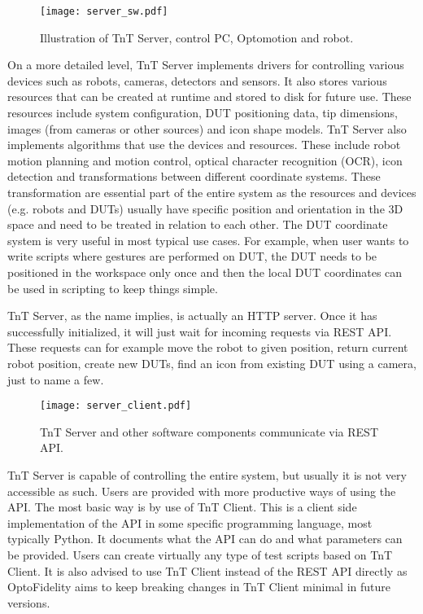 \begin{figure}[!h]
	\centering
	\texttt{[image: server\_sw.pdf]}
	\caption{Illustration of TnT Server, control PC, Optomotion and robot.}
	\label{fig:server_sw}
\end{figure}

On a more detailed level, TnT Server implements drivers for controlling various devices such as robots, cameras, detectors and sensors. It also stores various resources that can be created at runtime and stored to disk for future use. These resources include system configuration, DUT positioning data, tip dimensions, images (from cameras or other sources) and icon shape models. TnT Server also implements algorithms that use the devices and resources. These include robot motion planning and motion control, optical character recognition (OCR), icon detection and transformations between different coordinate systems. These transformation are essential part of the entire system as the resources and devices (e.g. robots and DUTs) usually have specific position and orientation in the 3D space and need to be treated in relation to each other. The DUT coordinate system is very useful in most typical use cases. For example, when user wants to write scripts where gestures are performed on DUT, the DUT needs to be positioned in the workspace only once and then the local DUT coordinates can be used in scripting to keep things simple.

TnT Server, as the name implies, is actually an HTTP server. Once it has successfully initialized, it will just wait for incoming requests via REST API. These requests can for example move the robot to given position, return current robot position, create new DUTs, find an icon from existing DUT using a camera, just to name a few.

\begin{figure}[!h]
	\centering
	\texttt{[image: server\_client.pdf]}
	\caption{TnT Server and other software components communicate via REST API.}
	\label{fig:server_client}
\end{figure}

TnT Server is capable of controlling the entire system, but usually it is not very accessible as such. Users are provided with more productive ways of using the API. The most basic way is by use of TnT Client. This is a client side implementation of the API in some specific programming language, most typically Python. It documents what the API can do and what parameters can be provided. Users can create virtually any type of test scripts based on TnT Client. It is also advised to use TnT Client instead of the REST API directly as OptoFidelity aims to keep breaking changes in TnT Client minimal in future versions.


